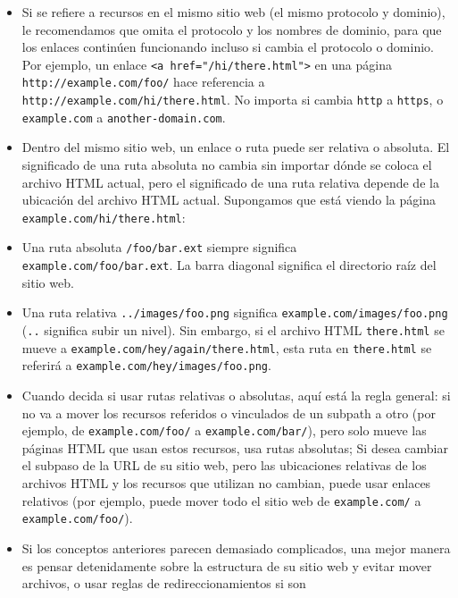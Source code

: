 \documentclass[12pt,]{krantz}
\theoremstyle{definition}
\theoremstyle{definition}
\theoremstyle{definition}
\theoremstyle{remark}
\begin{document}
\begin{itemize}
  \begin{itemize}
  \item
    Si se refiere a recursos en el mismo sitio web (el mismo protocolo y
    dominio), le recomendamos que omita el protocolo y los nombres de
    dominio, para que los enlaces continúen funcionando incluso si
    cambia el protocolo o dominio. Por ejemplo, un enlace
    \texttt{\textless{}a\ href="/hi/there.html"\textgreater{}} en una
    página \texttt{http://example.com/foo/} hace referencia a
    \texttt{http://example.com/hi/there.html}. No importa si cambia
    \texttt{http} a \texttt{https}, o \texttt{example.com} a
    \texttt{another-domain.com}.
  \item
    Dentro del mismo sitio web, un enlace o ruta puede ser relativa o
    absoluta. El significado de una ruta absoluta no cambia sin importar
    dónde se coloca el archivo HTML actual, pero el significado de una
    ruta relativa depende de la ubicación del archivo HTML actual.
    Supongamos que está viendo la página
    \texttt{example.com/hi/there.html}:
  \item
    Una ruta absoluta \texttt{/foo/bar.ext} siempre significa
    \texttt{example.com/foo/bar.ext}. La barra diagonal significa el
    directorio raíz del sitio web.
  \item
    Una ruta relativa \texttt{../images/foo.png} significa
    \texttt{example.com/images/foo.png} (\texttt{..} significa subir un
    nivel). Sin embargo, si el archivo HTML \texttt{there.html} se mueve
    a \texttt{example.com/hey/again/there.html}, esta ruta en
    \texttt{there.html} se referirá a
    \texttt{example.com/hey/images/foo.png}.
  \item
    Cuando decida si usar rutas relativas o absolutas, aquí está la
    regla general: si no va a mover los recursos referidos o vinculados
    de un subpath a otro (por ejemplo, de \texttt{example.com/foo/} a
    \texttt{example.com/bar/}), pero solo mueve las páginas HTML que
    usan estos recursos, usa rutas absolutas; Si desea cambiar el
    subpaso de la URL de su sitio web, pero las ubicaciones relativas de
    los archivos HTML y los recursos que utilizan no cambian, puede usar
    enlaces relativos (por ejemplo, puede mover todo el sitio web de
    \texttt{example.com/} a \texttt{example.com/foo/}).
  \item
    Si los conceptos anteriores parecen demasiado complicados, una mejor
    manera es pensar detenidamente sobre la estructura de su sitio web y
    evitar mover archivos, o usar reglas de redireccionamientos si son

\end{itemize}
\end{itemize}
\end{document}

